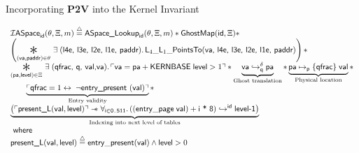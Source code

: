 \documentclass[aspectratio=169,xcolor=dvipsnames]{beamer}
\newcommand{\gammaPred}{\delta}
\newcommand{\ptableabswalk}[1]{\mathcal{A}\textsf{bsPTableWalk}(#1)}
\newcommand{\ptablestore}{\theta}
\newcommand*{\ownGhostpv}[2]{\boxedassertpv[dash dot]{#2}[#1]}
\newcommand{\ghostmaptoken}[3]{\ensuremath{#2\hookrightarrow^{#1}#3}}
\newcommand{\fracghostmaptoken}[4]{\ensuremath{#2\hookrightarrow^{#1}_{#4}#3}}
\newcommand{\vale}{\textsf{val}}
\newcommand{\pvmapping}[1]{\mathcal{A}\textsf{PVMappings}(#1)}
\begin{document}
\begin{frame}{Incorporating \textbf{P2V} into the Kernel Invariant}\scriptsize
    \begin{definition}
        
\[
\begin{array}{l}
  \mathcal{I}\textsf{ASpace}_{\textsf{id}}(\ptablestore,\Xi,m)\stackrel{\triangle}{=} \textsf{ASpace\_Lookup}_{\textsf{id}}(\ptablestore,\Xi,m) \ast \mathsf{GhostMap}(\mathsf{id},\Xi)\ast\\
  \left(\bigast{(\vaddr, \textsf{paddr})\in \ptablestore}{\exists\;(\textsf{l4e, l3e, l2e, l1e, paddr})\ldotp \textsf{L}_{4}\_\textsf{L}_{1}\_\textsf{PointsTo}(\vaddr\textsf{, l4e, l3e, l2e, l1e, paddr})}\right)\ast \\
  \bigast{(\paddr,\mathsf{level}) \in \Xi}{\exists\; (\textsf{qfrac, q, val,}\vaddr) \ldotp \ulcorner \vaddr = \paddr + \textsf{KERNBASE} \; \textsf{level} > 1\urcorner \ast  \underbrace{\fracghostmaptoken{\delta}{\vaddr}{\paddr}{\qfrac} }_\text{Ghost translation} \ast \underbrace{\paddr \mapsto_{\mathsf{p}}\{\textsf{qfrac}\}\; \vale}_\text{Physical location}} \ast\\
   \qquad\underbrace{ \ulcorner \textsf{qfrac} = 1 \leftrightarrow \; \lnot\textsf{entry\_present }(\vale) \urcorner}_\text{Entry validity}\ast \\
    \underbrace{\left(\ulcorner\textsf{present\_L}(\vale,\mathsf{level})\urcorner \wand \forall_{\textsf{i}\in\textsf{0..511}} \ldotp \ghostmaptoken{\textsf{id}}{((\mathsf{entry\_page}\;\vale) + \textsf{i * 8})}{\textsf{level-1}}\right)}_{\text{Indexing into next level of tables}} \\ %
  \textsf{ where } \\
  \textsf{present\_L}(\vale,\mathsf{level})\stackrel{\triangle}{=} \mathsf{entry\_present}(\vale)\land \mathsf{level} > 0
  
\end{array}
\]
\end{definition}
\end{frame}
\end{document}
